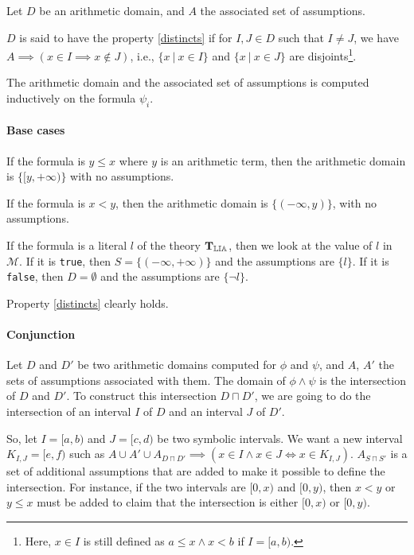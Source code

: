\begin{property}[Distincts]

Let $D$ be an arithmetic domain, and $A$ the associated set of assumptions.

$D$ is said to have the property \ref{distincts} if for $I, J \in D$ such that
$I \neq J$, we have $A \implies (x \in I \implies x \not\in J)$, i.e.,
$\{x\ |\ x \in I\}$ and $\{x\ |\ x \in J\}$ are
disjoints\footnote{Here, $x \in I$ is still defined as $a \le x \land x < b$ if $I = [a, b)$.}.

\label{distincts}

\end{property}


The arithmetic domain and the associated set of assumptions is computed inductively on the formula
$\psi_i$.

\paragraph{Base cases}

If the formula is $y \le x$ where $y$ is an arithmetic term, then the arithmetic domain is
$\{[y, +\infty)\}$ with no assumptions.

If the formula is $x < y$, then the arithmetic domain is $\{(-\infty, y)\}$, with no assumptions.

If the formula is a literal $l$ of the theory $\operatorname{\mathbf{T}_{\mathbb{LIA}}}$, then we look at the value of $l$ in
$\mathcal{M}$. If it is \texttt{true}, then $S = \{(-\infty, +\infty)\}$ and the assumptions are
$\{l\}$. If it is \texttt{false}, then $D = \emptyset$ and the assumptions are $\{\lnot l\}$.

Property \ref{distincts} clearly holds.

\paragraph{Conjunction}

Let $D$ and $D'$ be two arithmetic domains computed for $\phi$ and $\psi$, and
$A$, $A'$ the sets of assumptions associated with
them. The domain of $\phi\land\psi$ is the intersection of $D$ and $D'$. To construct this intersection $D \sqcap D'$, we are going to
do the intersection of an interval $I$ of $D$ and an interval $J$
of $D'$.

So, let $I = [a, b)$ and $J = [c, d)$ be two symbolic intervals. We want a new
interval $K_{I, J} = [e, f)$ such as
$A \cup A' \cup A_{D \sqcap D'} \implies \left(x \in I \land x \in J \iff x \in K_{I, J}\right)$.
$A_{S \sqcap S'}$ is a set of additional assumptions that are added to make it possible to define
the
intersection. For instance, if the two intervals are $[0, x)$ and $[0, y)$, then $x < y$ or $y \le x$
must be added to claim that the intersection is either $[0, x)$ or $[0, y)$.

